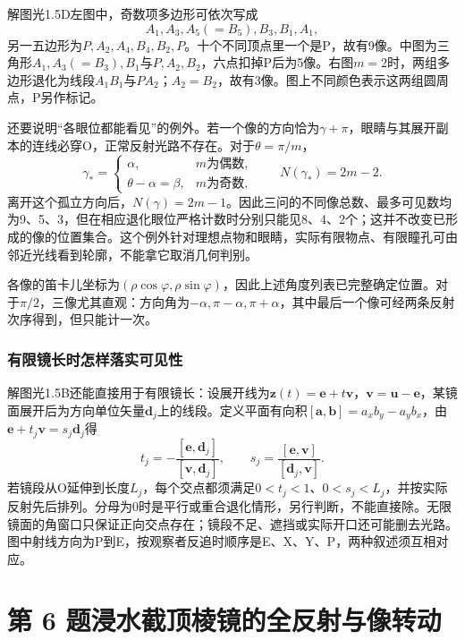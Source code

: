 \documentclass[UTF8,fontset=fandol,a4paper,11pt]{ctexart}
\begin{document}
解图光1.5D左图中，奇数项多边形可依次写成
\[
A_1,A_3,A_5(=B_5),B_3,B_1,A_1,
\]
另一五边形为$P,A_2,A_4,B_4,B_2,P$。十个不同顶点里一个是P，故有9像。中图为三角形$A_1,A_3(=B_3),B_1$与$P,A_2,B_2$，六点扣掉P后为5像。右图$m=2$时，两组多边形退化为线段$A_1B_1$与$PA_2$；$A_2=B_2$，故有3像。图上不同颜色表示这两组圆周点，P另作标记。

还要说明“各眼位都能看见”的例外。若一个像的方向恰为$\gamma+\pi$，眼睛与其展开副本的连线必穿O，正常反射光路不存在。对于$\theta=\pi/m$，
\[
\gamma_*=
\begin{cases}
\alpha,&m\text{为偶数},\\
\theta-\alpha=\beta,&m\text{为奇数},
\end{cases}
\qquad
N(\gamma_*)=2m-2.
\]
离开这个孤立方向后，$N(\gamma)=2m-1$。因此三问的不同像总数、最多可见数均为9、5、3，但在相应退化眼位严格计数时分别只能见8、4、2个；这并不改变已形成的像的位置集合。这个例外针对理想点物和眼睛，实际有限物点、有限瞳孔可由邻近光线看到轮廓，不能拿它取消几何判别。

各像的笛卡儿坐标为$(\rho\cos\varphi,\rho\sin\varphi)$，因此上述角度列表已完整确定位置。对于$\pi/2$，三像尤其直观：方向角为$-\alpha,\pi-\alpha,\pi+\alpha$，其中最后一个像可经两条反射次序得到，但只能计一次。

\subsubsection*{有限镜长时怎样落实可见性}
解图光1.5B还能直接用于有限镜长：设展开线为$\boldsymbol z(t)=\boldsymbol e+t\boldsymbol v$，$\boldsymbol v=\boldsymbol u-\boldsymbol e$，某镜面展开后为方向单位矢量$\boldsymbol d_j$上的线段。定义平面有向积$[\boldsymbol a,\boldsymbol b]=a_xb_y-a_yb_x$，由$\boldsymbol e+t_j\boldsymbol v=s_j\boldsymbol d_j$得
\[
t_j=-\frac{[\boldsymbol e,\boldsymbol d_j]}{[\boldsymbol v,\boldsymbol d_j]},
\qquad
s_j=\frac{[\boldsymbol e,\boldsymbol v]}{[\boldsymbol d_j,\boldsymbol v]}.
\]
若镜段从O延伸到长度$L_j$，每个交点都须满足$0<t_j<1$、$0<s_j<L_j$，并按实际反射先后排列。分母为0时是平行或重合退化情形，另行判断，不能直接除。无限镜面的角窗口只保证正向交点存在；镜段不足、遮挡或实际开口还可能删去光路。图中射线方向为P到E，按观察者反追时顺序是E、X、Y、P，两种叙述须互相对应。




\section*{第 6 题\quad 浸水截顶棱镜的全反射与像转动}\label{q:6}
\end{document}
